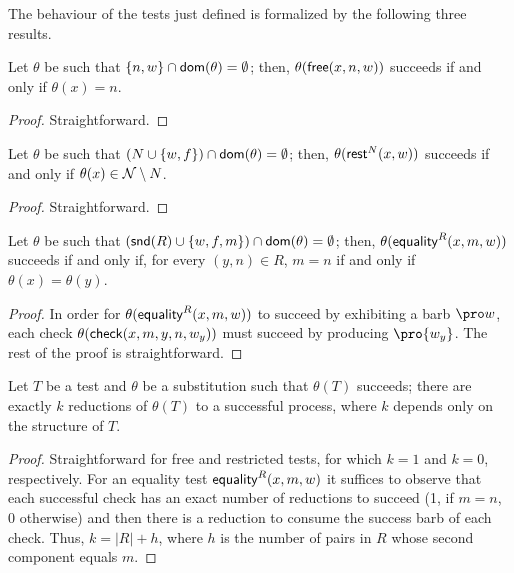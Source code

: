 \documentclass{LMCS}
\begin{document}
The behaviour of the tests just defined is formalized by the following three results.

\begin{lem}
\label{lem:free-succ}
Let $\theta$ be such that $\{n,w\} \cap {\sf dom}(\theta) = \emptyset$; then,
$\theta({\sf free}(x,n,w))$ succeeds if and only if $\theta(x)=n$.
\end{lem}
\begin{proof}
Straightforward.
\end{proof}

\begin{lem}
\label{lem:rest-succ}
Let $\theta$ be such that $(N \cup \{w,f\}) \cap {\sf dom}(\theta) = \emptyset$; then,
$\theta({\sf rest}^N(x,w))$ succeeds if and only if $\theta(x) \in {\cal N} \setminus N$.
\end{lem}
\begin{proof}
Straightforward.
\end{proof}

\begin{lem}
\label{lem:equi-succ}
Let $\theta$ be such that $({\sf snd}(R) \cup \{w,f,m\}) \cap {\sf dom}(\theta) = \emptyset$; then,
$\theta({\sf equality}^R(x,m,w))$ succeeds if and only if, for every $(y,n)\in R$, 
$m=n$ if and only if $\theta(x)=\theta(y)$.
\end{lem}
\begin{proof}
In order for $\theta({\sf equality}^R(x,m,w))$ to succeed by exhibiting a barb $\pro w$, 
each check $\theta({\sf check}(x,m,y,n,w_y))$ must succeed by producing $\pro {w_y}$.
The rest of the proof is straightforward.
\end{proof}

\begin{lem}
\label{lem:exact-reduct-tests}
Let $T$ be a test and $\theta$ be a substitution such that $\theta(T)$ succeeds; 
there are exactly $k$ reductions of $\theta(T)$ to a successful process, where $k$ depends only on the structure of $T$.
\end{lem}
\begin{proof}
Straightforward for free and restricted tests, for which $k = 1$ and $k = 0$, respectively. 
For an equality test ${\sf equality}^R(x,m,w)$ it suffices to observe that each successful check has an exact 
number of reductions to succeed (1, if $m=n$, 0 otherwise) and then there is a reduction to consume the success 
barb of each check.
Thus, $k = |R|+h$, where $h$ is the number of pairs in $R$ whose second component equals $m$.
\end{proof}
\end{document}
